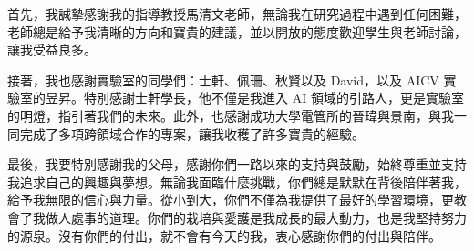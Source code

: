 \begin{acknowledgement}%

首先，我誠摯感謝我的指導教授馬清文老師，無論我在研究過程中遇到任何困難，老師總是給予我清晰的方向和寶貴的建議，並以開放的態度歡迎學生與老師討論，讓我受益良多。

接著，我也感謝實驗室的同學們：士軒、佩珊、秋賢以及 David，以及 AICV 實驗室的昱昇。特別感謝士軒學長，他不僅是我進入 AI 領域的引路人，更是實驗室的明燈，指引著我們的未來。此外，也感謝成功大學電管所的晉瑋與景南，與我一同完成了多項跨領域合作的專案，讓我收穫了許多寶貴的經驗。

最後，我要特別感謝我的父母，感謝你們一路以來的支持與鼓勵，始終尊重並支持我追求自己的興趣與夢想。無論我面臨什麼挑戰，你們總是默默在背後陪伴著我，給予我無限的信心與力量。從小到大，你們不僅為我提供了最好的學習環境，更教會了我做人處事的道理。你們的栽培與愛護是我成長的最大動力，也是我堅持努力的源泉。沒有你們的付出，就不會有今天的我，衷心感謝你們的付出與陪伴。

\thispagestyle{empty}
\end{acknowledgement}